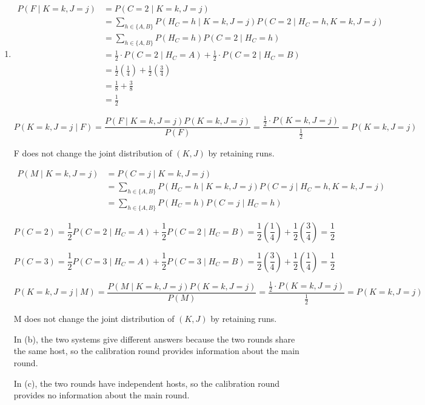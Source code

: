 \documentclass[11pt,a4paper]{article}
\begin{document}
\begin{enumerate}
    $$
    P(K=1 \mid J=3, F) = \frac{9}{25} \neq \frac{15}{31} = P(K=1 \mid J=3, M)
    $$

    And the probability distributions of $J$ are different in the two systems, so the equality in part (a) does not imply equality of these two probabilities.

    \item[(c)]
    
    $$
    \begin{aligned}
    P(F \mid K=k, J=j)
    &= P(C=2 \mid K=k, J=j) \\
    &= \sum_{h \in \{A, B\}} P(H_C = h \mid K=k, J=j) P(C=2 \mid H_C = h, K=k, J=j) \\
    &= \sum_{h \in \{A, B\}} P(H_C = h) P(C=2 \mid H_C = h) \\
    &= \frac{1}{2} \cdot P(C=2 \mid H_C=A) + \frac{1}{2} \cdot P(C=2 \mid H_C=B) \\
    &= \frac{1}{2} \left(\frac{1}{4}\right) + \frac{1}{2} \left(\frac{3}{4}\right) \\
    &= \frac{1}{8} + \frac{3}{8} \\
    &= \frac{1}{2}
    \end{aligned}
    $$

    $$
    P(K=k, J=j \mid F) 
    = \frac{P(F \mid K=k, J=j) P(K=k, J=j)}{P(F)}
    = \frac{\frac{1}{2} \cdot P(K=k, J=j)}{\frac{1}{2}}
    = P(K=k, J=j)
    $$

    F does not change the joint distribution of $(K,J)$ by retaining runs.

    $$
    \begin{aligned}
    P(M \mid K=k, J=j) &= P(C=j \mid K=k, J=j) \\
    &= \sum_{h \in \{A, B\}} P(H_C = h \mid K=k, J=j) P(C=j \mid H_C = h, K=k, J=j) \\
    &= \sum_{h \in \{A, B\}} P(H_C = h) P(C=j \mid H_C = h)
    \end{aligned}
    $$

    $$
    P(C=2)
    = \frac{1}{2}P(C=2 \mid H_C=A) + \frac{1}{2}P(C=2 \mid H_C=B)
    = \frac{1}{2} \left(\frac{1}{4}\right) + \frac{1}{2} \left(\frac{3}{4}\right)
    = \frac{1}{2}
    $$

    $$
    P(C=3)
    = \frac{1}{2}P(C=3 \mid H_C=A) + \frac{1}{2}P(C=3 \mid H_C=B)
    = \frac{1}{2} \left(\frac{3}{4}\right) + \frac{1}{2} \left(\frac{1}{4}\right)
    = \frac{1}{2}
    $$

    $$
    P(K=k, J=j \mid M) = \frac{P(M \mid K=k, J=j) P(K=k, J=j)}{P(M)} = \frac{\frac{1}{2} \cdot P(K=k, J=j)}{\frac{1}{2}} = P(K=k, J=j)
    $$

    M does not change the joint distribution of $(K,J)$ by retaining runs.

    In (b), the two systems give different answers because the two rounds share the same host, so the calibration round provides information about the main round.
    
    In (c), the two rounds have independent hosts, so the calibration round provides no information about the main round.
\end{enumerate}
\end{document}
